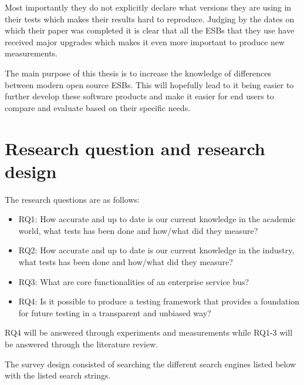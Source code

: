 \documentclass{llncs}
\begin{document}
Most importantly they do not explicitly declare what versions they are using in their tests which makes their results hard to reproduce. 
Judging by the dates on which their paper was completed it is clear that all the ESBs that they use have received major upgrades which makes it even more important to produce new measurements.

The main purpose of this thesis is to increase the knowledge of differences between modern open source ESBs. 
This will hopefully lead to it being easier to further develop these software products and make it easier for end users to compare and evaluate based on their specific needs.


\section{Research question and research design}
The research questions are as follows: 
\begin{itemize}
	\item RQ1: How accurate and up to date is our current knowledge in the academic world, what tests has been done and how/what did they measure?
	\item RQ2: How accurate and up to date is our current knowledge in the industry, what tests has been done and how/what did they measure?
	\item RQ3: What are core functionalities of an enterprise service bus?
	\item RQ4: Is it possible to produce a testing framework that provides a foundation for future testing in a transparent and unbiased way?
\end{itemize}
RQ4 will be answered through experiments and measurements while RQ1-3 will be answered through the literature review. 

The survey design consisted of searching the different search engines listed below with the listed search strings. \\
\end{document}
